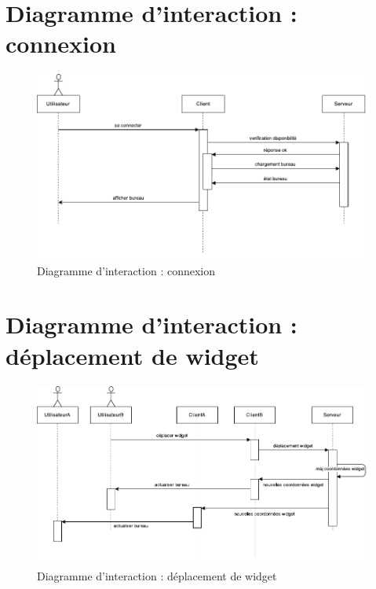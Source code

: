 \section{Diagramme d'interaction : connexion}
\begin{figure}[H]
	\centering
	\includegraphics[angle=90]{diagrammes/DI1.pdf}
	\caption{Diagramme d'interaction : connexion}
\end{figure}

\section{Diagramme d'interaction : déplacement de widget}
\begin{figure}[H]
	\centering
	\includegraphics[angle=90]{diagrammes/DI2.pdf}
	\caption{Diagramme d'interaction : déplacement de widget}
\end{figure}

